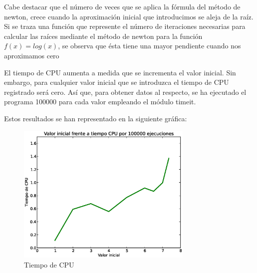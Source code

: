 \documentclass{beamer}
\begin{document}
\begin{frame}
Cabe destacar que el número de veces que se aplica la fórmula del método de newton, crece cuando la aproximación inicial que introducimos se aleja de la raíz. 
Si se traza una función que represente el número de iteraciones necesarias para calcular las raíces mediante el método de newton para la función $f(x)= log(x)$, se observa que ésta tiene una mayor pendiente cuando nos aproximamos cero
\end{frame}

\begin{frame}
El tiempo de CPU aumenta a medida que se incrementa el valor inicial. Sin embargo, para cualquier valor inicial que se introduzca el tiempo de CPU 
registrado será cero. Así que, para obtener datos al respecto, se ha ejecutado el programa 100000 para cada valor empleando el módulo timeit.



\end{frame}
\begin{frame}
Estos resultados se han representado en la siguiente gráfica:
\begin{figure}[!th]

\begin{center}

\includegraphics[width=0.75\textwidth]{images/time.eps}

\caption{Tiempo de CPU}

\label{fig:2}

\end{center}

\end{figure} 
\end{frame}
\end{document}

